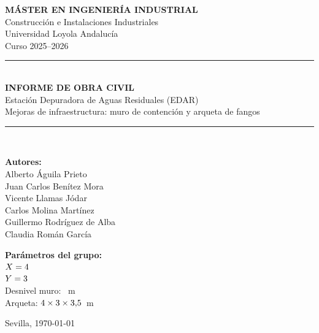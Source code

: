 \begin{titlepage}
  \centering

  \vspace*{1cm}


  {\Large \textbf{MÁSTER EN INGENIERÍA INDUSTRIAL}}\\[0.3cm]
  {\large Construcción e Instalaciones Industriales}\\[0.3cm]
  {\large Universidad Loyola Andalucía}\\[0.3cm]
  {\large Curso 2025--2026}

  \vspace{1.5cm}
  \rule{\linewidth}{0.5mm}\\[0.4cm]

  {\LARGE \bfseries INFORME DE OBRA CIVIL}\\[0.3cm]
  {\Large Estación Depuradora de Aguas Residuales (EDAR)}\\[0.2cm]
  {\large Mejoras de infraestructura: muro de contención y arqueta de fangos}

  \rule{\linewidth}{0.5mm}\\[1.5cm]

  \begin{minipage}{0.45\textwidth}
    \begin{flushleft}
      \large
      \textbf{Autores:}\\[0.3cm]
      Alberto Águila Prieto\\
      Juan Carlos Benítez Mora\\
      Vicente Llamas Jódar\\
      Carlos Molina Martínez\\
      Guillermo Rodríguez de Alba\\
      Claudia Román García
    \end{flushleft}
  \end{minipage}
  \hfill
  \begin{minipage}{0.45\textwidth}
    \begin{flushright}
      \large
      \textbf{Parámetros del grupo:}\\[0.3cm]
      $X = 4$\\
      $Y = 3$\\
      Desnivel muro: \alturaDesnivelMuro\ m\\
      Arqueta: $4 \times 3 \times 3{,}5$\ m
    \end{flushright}
  \end{minipage}

  \vfill

  {\large Sevilla, \today}
\end{titlepage}
\clearpage
